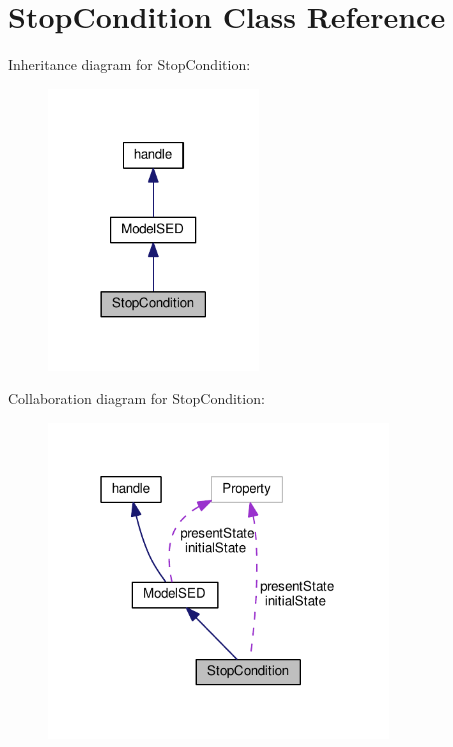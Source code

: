 \hypertarget{class_stop_condition}{}\section{Stop\+Condition Class Reference}
\label{class_stop_condition}


Inheritance diagram for Stop\+Condition\+:
\nopagebreak
\begin{figure}[H]
\begin{center}
\leavevmode
\includegraphics[width=158pt]{class_stop_condition__inherit__graph}
\end{center}
\end{figure}


Collaboration diagram for Stop\+Condition\+:
\nopagebreak
\begin{figure}[H]
\begin{center}
\leavevmode
\includegraphics[width=256pt]{class_stop_condition__coll__graph}
\end{center}
\end{figure}
